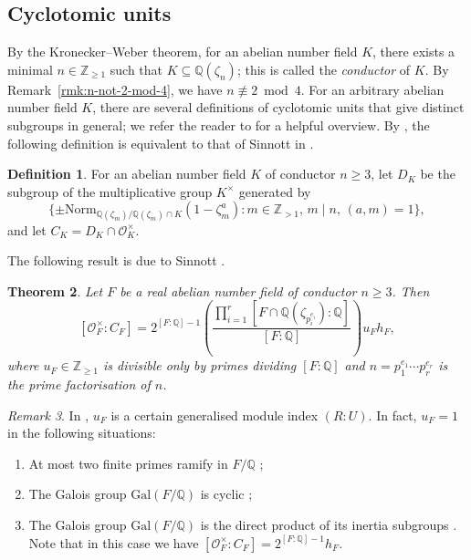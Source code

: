 \documentclass[12pt, a4paper, usenames]{amsart}
\newcommand{\Z}{\mathbb{Z}}
\newcommand{\Q}{\mathbb{Q}}
\theoremstyle{plain}
\newtheorem{theorem}{Theorem}[section]
\theoremstyle{remark}
\newtheorem{remark}[theorem]{Remark}
\theoremstyle{definition}
\newtheorem{definition}[theorem]{Definition}
\newcommand{\Gal}{\mathrm{Gal}}
\newcommand{\Norm}{\mathrm{Norm}}
\begin{document}
\subsection{Cyclotomic units}
By the Kronecker--Weber theorem, 
for an abelian number field $K$,
there exists a minimal $n \in \Z_{\geq 1}$
such that $K \subseteq \Q(\zeta_{n})$; this is called the \emph{conductor}
of $K$. By Remark~\ref{rmk:n-not-2-mod-4}, we have $n \not \equiv 2 \bmod 4$.
For an arbitrary abelian number field $K$, 
there are several definitions of cyclotomic units that give distinct subgroups in general;
we refer the reader to \cite{MR2183100} for a helpful overview. 
By \cite[Proposition~1]{MR1057325}, the following definition is equivalent 
to that of Sinnott in \cite[\S 4]{MR595586}.

\begin{definition}\label{def:cyclo-units-abelian}
For an abelian number field $K$ of conductor $n \geq 3$, let $D_{K}$
be the subgroup of the multiplicative group $K^{\times}$ generated by 
\[
\{ \pm\Norm_{\Q(\zeta_{m})/\Q(\zeta_{m}) \cap K}(1-\zeta_{m}^a) 
: m \in \Z_{>1}, \, m \mid n, \, (a,m)= 1 \},
\]
and let $C_{K} = D_{K} \cap \mathcal{O}_{K}^{\times}$.
\end{definition}

The following result is due to Sinnott
\cite[Theorem~4.1 and Proposition~5.1]{MR595586}.

\begin{theorem}\label{thm:sinnott-abelian}
Let $F$ be a real abelian number field of conductor $n \geq 3$.
Then 
\[
[\mathcal{O}_{F}^{\times} : C_{F}] 
= 2^{[F:\Q]-1} 
\left(\frac{\prod_{i=1}^{r}[F \cap \Q(\zeta_{p_{i}^{e_{i}}}):\Q]}{[F:\Q]}\right) u_{F}h_{F},
\]
where $u_{F} \in \Z_{\geq 1}$ is divisible only by primes dividing $[F:\Q]$
and $n=p_{1}^{e_{1}} \cdots p_{r}^{e_{r}}$ is the prime factorisation of $n$.
\end{theorem}

\begin{remark}\label{rmk:cF=1}
In \cite{MR595586}, $u_{F}$ is a certain generalised module index $(R:U)$.
In fact, $u_{F}=1$ in the following situations:
\begin{enumerate}
    \item At most two finite primes ramify in $F/\Q$ \cite[Theorem~5.1]{MR595586};
    \item The Galois group $\Gal(F/\Q)$ is cyclic \cite[Theorem~5.3]{MR595586};
    \item The Galois group $\Gal(F/\Q)$ is the direct product of its inertia
    subgroups \cite[Theorem~5.4]{MR595586}. 
    Note that in this case we have 
    $[\mathcal{O}_{F}^{\times} : C_{F}] = 2^{[F:\Q]-1}h_{F}$.  
\end{enumerate}
\end{remark}
\end{document}
